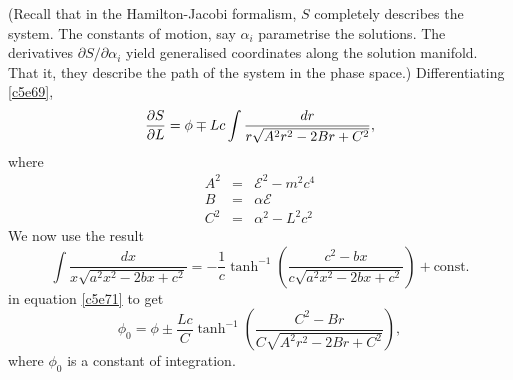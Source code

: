 \begin{enumerate}
(Recall that in the Hamilton-Jacobi formalism, $S$ completely describes the
system. The constants of motion, say $\alpha_i$ parametrise the solutions.
The derivatives $\partial{S}/\partial{\alpha_i}$ yield generalised coordinates
along the solution manifold. That it, they describe the path of the system in
the phase space.) Differentiating \eqref{c5e69},
\begin{equation}\label{c5e71}
\frac{\partial{S}}{\partial{L}} = \phi \mp Lc\int\frac{dr}{r\sqrt{A^2r^2 - 2Br + C^2}},
\end{equation}
where
\begin{eqnarray}
A^2 &=& \mathcal{E}^2 - m^2c^4 \label{c5e72} \\
B   &=& \alpha\mathcal{E} \label{c5e73} \\
C^2 &=& \alpha^2 - L^2c^2 \label{c5e74}
\end{eqnarray}
We now use the result
\begin{equation}\label{c5e75}
\int\frac{dx}{x\sqrt{a^2x^2 - 2bx + c^2}} = 
-\frac{1}{c}\tanh^{-1}\left(\frac{c^2 - bx}{c\sqrt{a^2x^2 - 2bx + c^2}}\right) +
\text{const}.
\end{equation}
in equation \eqref{c5e71} to get
\begin{equation}\label{c5e76}
\phi_0 = \phi \pm \frac{Lc}{C}\tanh^{-1}\left(\frac{C^2 - Br}{C\sqrt{A^2r^2 - 
2Br + C^2}}\right),
\end{equation}
where $\phi_0$ is a constant of integration.


\end{enumerate}
